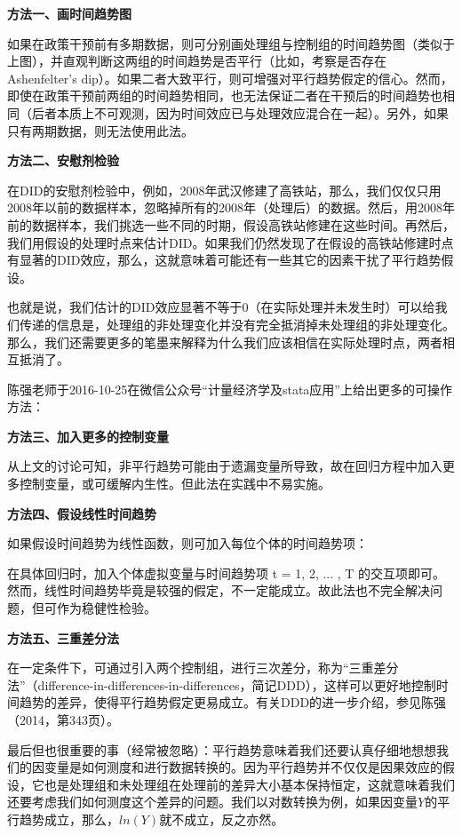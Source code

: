\documentclass[cn,12pt,math=newtx,citestyle=gb7714-2015,bibstyle=gb7714-2015]{elegantbook}
\begin{document}
	\textbf{方法一、画时间趋势图}
	
	如果在政策干预前有多期数据，则可分别画处理组与控制组的时间趋势图（类似于上图），并直观判断这两组的时间趋势是否平行（比如，考察是否存在Ashenfelter's dip）。如果二者大致平行，则可增强对平行趋势假定的信心。然而，即使在政策干预前两组的时间趋势相同，也无法保证二者在干预后的时间趋势也相同（后者本质上不可观测，因为时间效应已与处理效应混合在一起）。另外，如果只有两期数据，则无法使用此法。
	
	\textbf{方法二、安慰剂检验}
	
	在DID的安慰剂检验中，例如，2008年武汉修建了高铁站，那么，我们仅仅只用2008年以前的数据样本，忽略掉所有的2008年（处理后）的数据。然后，用2008年前的数据样本，我们挑选一些不同的时期，假设高铁站修建在这些时间。再然后，我们用假设的处理时点来估计DID。如果我们仍然发现了在假设的高铁站修建时点有显著的DID效应，那么，这就意味着可能还有一些其它的因素干扰了平行趋势假设。
	
	也就是说，我们估计的DID效应显著不等于0（在实际处理并未发生时）可以给我们传递的信息是，处理组的非处理变化并没有完全抵消掉未处理组的非处理变化。那么，我们还需要更多的笔墨来解释为什么我们应该相信在实际处理时点，两者相互抵消了。
	
	陈强老师于2016-10-25在微信公众号“计量经济学及stata应用”上给出更多的可操作方法：
	
	\textbf{方法三、加入更多的控制变量}
	
	从上文的讨论可知，非平行趋势可能由于遗漏变量所导致，故在回归方程中加入更多控制变量，或可缓解内生性。但此法在实践中不易实施。
	
	\textbf{方法四、假设线性时间趋势}
	
	如果假设时间趋势为线性函数，则可加入每位个体的时间趋势项：
	
	在具体回归时，加入个体虚拟变量与时间趋势项 t = 1, 2, ... , T 的交互项即可。然而，线性时间趋势毕竟是较强的假定，不一定能成立。故此法也不完全解决问题，但可作为稳健性检验。
	
	\textbf{方法五、三重差分法}
	
	在一定条件下，可通过引入两个控制组，进行三次差分，称为“三重差分法”（difference-in-differences-in-differences，简记DDD），这样可以更好地控制时间趋势的差异，使得平行趋势假定更易成立。有关DDD的进一步介绍，参见陈强（2014，第343页）。
	
	最后但也很重要的事（经常被忽略）：平行趋势意味着我们还要认真仔细地想想我们的因变量是如何测度和进行数据转换的。因为平行趋势并不仅仅是因果效应的假设，它也是处理组和未处理组在处理前的差异大小基本保持恒定，这就意味着我们还要考虑我们如何测度这个差异的问题。我们以对数转换为例，如果因变量$Y$的平行趋势成立，那么，$ln(Y)$就不成立，反之亦然。
	
\end{document}
